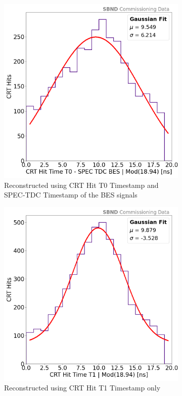 \begin{figure}[htbp!]
\begin{subfigure}[h]{0.49\linewidth}
\centering    
\includegraphics[width=\linewidth]{CRTT0_SPEC_Bucket}
\caption{Reconstructed using CRT Hit T0 Timestamp and SPEC-TDC Timestamp of the BES signals}
\end{subfigure}
\hfill
\begin{subfigure}[h]{0.49\linewidth}
\centering    
\includegraphics[width=\linewidth]{CRT_T1_Bucket}
\caption{Reconstructed using CRT Hit T1 Timestamp only}
\end{subfigure}%
\caption[beamBucket]{
}
\label{fig:beamBucket}
\end{figure}

